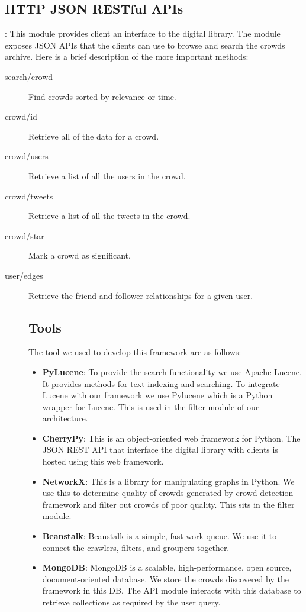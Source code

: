 \documentclass{sig-alternate}
\begin{document}
\subsection{HTTP JSON RESTful APIs}: This module provides client an interface to the digital library. The module exposes JSON APIs that the clients can use to browse and search the crowds archive. Here is a brief description of the more important methods:
\begin{description}
 \item[search/crowd] Find crowds sorted by relevance or time.
 \item[crowd/id] Retrieve all of the data for a crowd.
 \item[crowd/users] Retrieve a list of all the users in the crowd.
 \item[crowd/tweets] Retrieve a list of all the tweets in the crowd.
 \item[crowd/star] Mark a crowd as significant.
 \item[user/edges] Retrieve the friend and follower relationships for a given user.
\begin{description}

\subsection{Tools}

The tool we used to develop this framework are as follows:
\begin{itemize}
 \item \noindent\textbf{PyLucene}: To provide the search functionality we use Apache Lucene. It provides methods for text indexing and searching. To integrate Lucene with our framework we use Pylucene which is a Python wrapper for Lucene. This is used in the filter module of our architecture.
 \item \noindent\textbf{CherryPy}: This is an object-oriented web framework for Python. The JSON REST API that interface the digital library with clients is hosted using this web framework.
 \item \noindent\textbf{NetworkX}: This is a library for manipulating graphs in Python. We use this to determine quality of crowds generated by crowd detection framework and filter out crowds of poor quality. This sits in the filter module.
  \item \noindent\textbf{Beanstalk}: Beanstalk is a simple, fast work queue. We use it to connect the crawlers, filters, and groupers together.
   \item \noindent\textbf{MongoDB}: MongoDB is a scalable, high-performance, open source, document-oriented database. We store the crowds discovered by the framework in this DB. The API module interacts with this database to retrieve collections as required by the user query.
\end{itemize}


\end{description}
\end{description}
\end{document}
